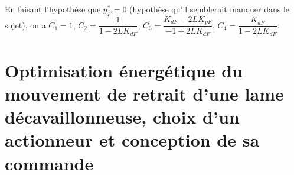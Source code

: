 \documentclass[11pt]{article}
\begin{document}
\begin{UPSTIcorrige}




%
%
%
%


En faisant l'hypothèse que $y^*_F = 0$ (hypothèse qu'il semblerait manquer dans le sujet), on a 
$C_1 = 1$, $C_2 = \dfrac{1}{ 1-2L K_{dF}}$, $C_3 =\dfrac{K_{dF} - 2LK_{pF}}{- 1+2L K_{dF}} $, $C_4=  \dfrac{ K_{dF}}{ 1-2L K_{dF}} $.

\end{UPSTIcorrige}




\section{Optimisation énergétique du mouvement de retrait d’une lame
décavaillonneuse, choix d’un actionneur et conception de sa commande}
\end{document}
